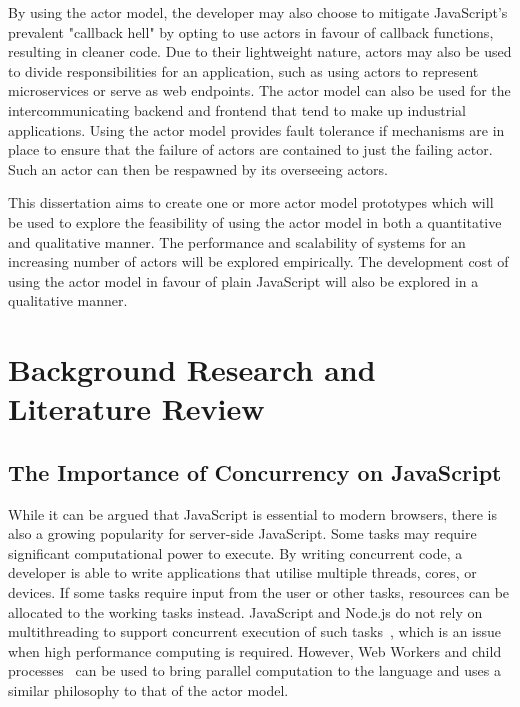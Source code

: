 \documentclass[12pt]{report}
\begin{document}
By using the actor model, the developer may also choose to mitigate JavaScript's prevalent "callback hell" by opting to use actors in favour of callback functions, resulting in cleaner code. Due to their lightweight nature, actors may also be used to divide responsibilities for an application, such as using actors to represent microservices or serve as web endpoints\cite{hewitt2010actor}.  The actor model can also be used for the intercommunicating backend and frontend that tend to make up industrial applications. Using the actor model provides fault tolerance if mechanisms are in place to ensure that the failure of actors are contained to just the failing actor. Such an actor can then be respawned by its overseeing actors.

This dissertation aims to create one or more actor model prototypes which will be used to explore the feasibility of using the actor model in both a quantitative and qualitative manner. The performance and scalability of systems for an increasing number of actors will be explored empirically. The development cost of using the actor model in favour of plain JavaScript will also be explored in a qualitative manner.
\section{Background Research and Literature Review}
\subsection{The Importance of Concurrency on JavaScript}
While it can be argued that JavaScript is essential to modern browsers, there is also a growing popularity for server-side JavaScript. Some tasks may require significant computational power to execute. By writing concurrent code, a developer is able to write applications that utilise multiple threads, cores, or devices. If some tasks require input from the user or other tasks, resources can be allocated to the working tasks instead. JavaScript and Node.js do not rely on multithreading to support concurrent execution of such tasks~\cite{highperformance}, which is an issue when high performance computing is required. However, Web Workers and child processes~\cite{concurrencyjs}\cite{spidersjs} can be used to bring parallel computation to the language and uses a similar philosophy to that of the actor model.
\end{document}
